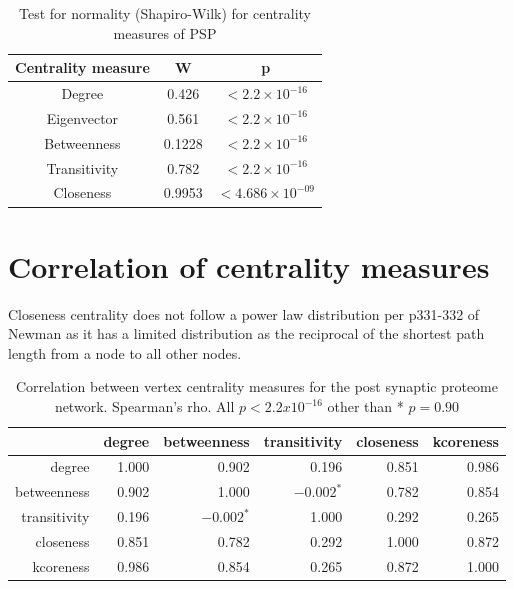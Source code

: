\begin{table}[h]
    \centering
    \begin{tabular}{c|c|c}
       Centrality measure  &  W& p\\
       \hline
       
       Degree  & 0.426 & $<2.2 \times 10^{-16}$ \\
       Eigenvector &0.561  & $<2.2 \times 10^{-16}$ \\
       Betweenness &0.1228& $<2.2 \times 10^{-16}$ \\
       Transitivity &0.782 & $<2.2 \times 10^{-16}$\\
       Closeness &0.9953& $<4.686 \times 10^{-09}$\\ 
    \end{tabular}
    \caption{Test for normality (Shapiro-Wilk) for centrality measures of PSP}
    \label{Table:Test for normality (Shapiro-Wilk) for centrality measures of PSP}
\end{table}

\section{Correlation of centrality measures}
Closeness centrality  does not follow a power law distribution per p331-332 of Newman as it has a limited distribution as the reciprocal of the shortest path length from a node to all other nodes. 
\begin{table}[ht]
\centering
\begin{tabular}{rrrrrr}
  \hline
 & degree & betweenness & transitivity & closeness & kcoreness \\ 
  \hline
degree & 1.000 & 0.902 & 0.196 & 0.851 & 0.986 \\ 
  betweenness & 0.902 & 1.000 & $-0.002^*$ & 0.782 & 0.854 \\ 
  transitivity & 0.196 & $-0.002^*$ & 1.000 & 0.292 & 0.265 \\ 
  closeness & 0.851 & 0.782 & 0.292 & 1.000 & 0.872 \\  
 

  kcoreness & 0.986 & 0.854 & 0.265 & 0.872 & 1.000 \\ 
   \hline
\end{tabular}
\caption{Correlation between vertex centrality measures for the post synaptic proteome network. Spearman's rho. All $p < 2.2 x 10^{-16}$ other than * $p=0.90$} 
\label{tab:Correlation between vertex centrality measures for PSP. Spearman's rho}
\end{table}




